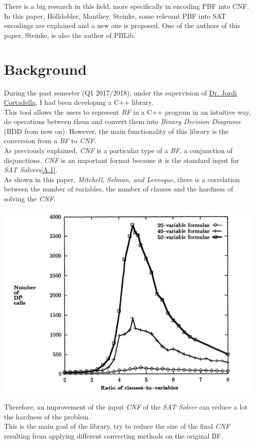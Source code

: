 There is a big research in this field, more specifically in encoding PBF into CNF. In this paper, Hölldobler, Manthey, Steinke\cite{Holldobler}, some relevant PBF into SAT encodings are explained and a new one is proposed. One of the authors of this paper, Steinke, is also the author of PBLib. 
 

\section{Background}

During the past semester (Q1 2017/2018), under the supervision of \href{https://www.cs.upc.edu/~jordicf/}{Dr. Jordi Cortadella}, I had been developing a C++ library.\\
This tool allows the users to represent \emph{BF} in a C++ program in an intuitive way, do operations between them and convert them into \emph{Binary Decision Diagrams} (BDD from now on). However, the main functionality of this library is the conversion from a \emph{BF} to \emph{CNF}.  \\
As previously explained, \emph{CNF} is a particular type of a \emph{BF}, a conjunction of disjunctions. \emph{CNF} is an important format because it is the standard input for \emph{SAT Solvers}\ref{A.1}.\\
As shown in this paper, \emph{Mitchell, Selman, and Levesque\cite{Mitchell}}, there is a correlation between the number of variables, the number of clauses and the hardness of solving the \emph{CNF}.
\begin{center}
	\includegraphics[width=1\textwidth]{Figures/GraphMitchellSelmanLevesque.png}
\end{center}
Therefore, an improvement of the input \emph{CNF} of the \emph{SAT Solver} can reduce a lot the hardness of the problem. \\
This is the main goal of the library, try to reduce the size of the final \emph{CNF} resulting from applying different converting methods on the original BF.

